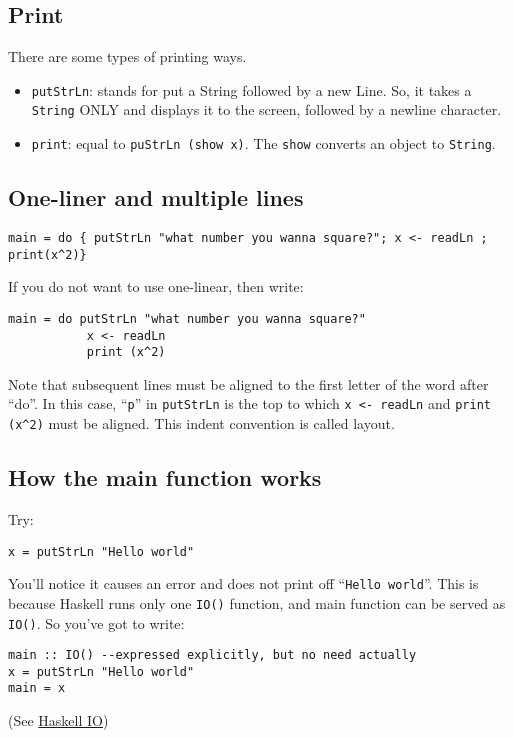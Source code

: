 \subsection{Print}
There are some types of printing ways.
\begin{itemize}
\item \lstinline{putStrLn}: stands for put a String followed by a new Line. So, it takes a \lstinline{String} ONLY and displays it to the screen, followed by a newline character.
\item \lstinline{print}: equal to \lstinline{puStrLn (show x)}. The \lstinline{show} converts an object to \lstinline{String}.
\end{itemize}


\subsection{One-liner and multiple lines}

\begin{lstlisting}
main = do { putStrLn "what number you wanna square?"; x <- readLn ;  print(x^2)} 
\end{lstlisting}

If you do not want to use one-linear, then write: 

\begin{lstlisting}
main = do putStrLn "what number you wanna square?" 
           x <- readLn
           print (x^2)
\end{lstlisting}
Note that subsequent lines must be aligned to the first letter of the word after “do”.
In this case, “\lstinline{p}” in \lstinline{putStrLn} is the top to which \lstinline{x <- readLn} and \lstinline{print (x^2)} must be aligned. 
This indent convention is called layout.

\subsection{How the main function works}
Try: 
\begin{lstlisting}
x = putStrLn "Hello world"
\end{lstlisting}

You’ll notice it causes an error and does not print off “\lstinline{Hello world}”. 
This is because Haskell runs only one \lstinline{IO()} function, and main function can be served as \lstinline{IO()}. 
So you’ve got to write:

\begin{lstlisting}
main :: IO() --expressed explicitly, but no need actually 
x = putStrLn "Hello world"
main = x 
\end{lstlisting}
(See \href{https://wiki.haskell.org/Introduction_to_Haskell_IO/Actions}{Haskell IO})

